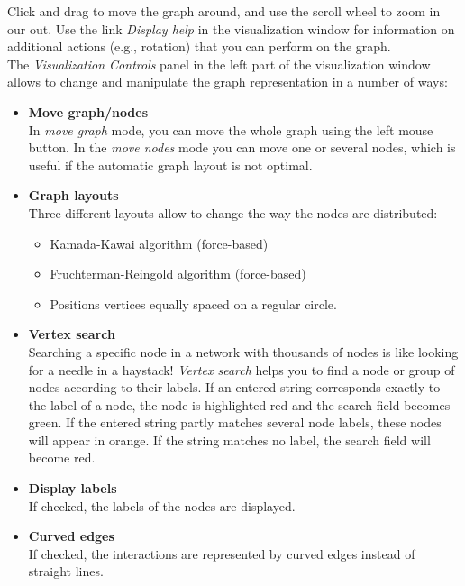 \documentclass{llncs}
\newenvironment{mylist}{
\begin{itemize}
}{\end{itemize}}
\begin{document}
Click and drag to move the graph around, and use the scroll wheel to zoom in our out. Use the link \emph{Display help} in the visualization window for information on additional actions (e.g., rotation) that you can perform on the graph.\\

The \emph{Visualization Controls} panel in the left part of the visualization window allows to change and manipulate the graph representation in a number of ways:
\begin{mylist}
 \item \textbf{Move graph/nodes}\\In \emph{move graph} mode, you can move the whole graph using the left mouse button. In the \emph{move nodes} mode you can move one or several nodes, which is useful if the automatic graph layout is not optimal.\\

 \item \textbf{Graph layouts}\\Three different layouts allow to change the way the nodes are distributed:
	\begin{itemize}
	 \item Kamada-Kawai algorithm (force-based)
	 \item Fruchterman-Reingold algorithm (force-based)
	 \item Positions vertices equally spaced on a regular circle.\\
	\end{itemize}
 
 \item \textbf{Vertex search}\\Searching a specific node in a network with thousands of nodes is like looking for a needle in a haystack! \emph{Vertex search} helps you to find a node or group of nodes according to their labels. If an entered string corresponds exactly to the label of a node, the node is highlighted red and the search field becomes green. If the entered string partly matches several node labels, these nodes will appear in orange. If the string matches no label, the search field will become red.\\
 
 \item \textbf{Display labels}\\If checked, the labels of the nodes are displayed.\\
 
 \item \textbf{Curved edges}\\If checked, the interactions are represented by curved edges instead of straight lines.\\
 

\end{mylist}
\end{document}

